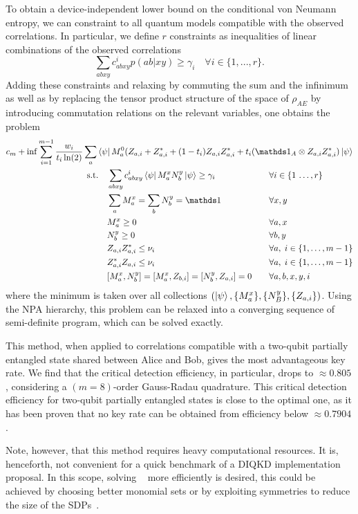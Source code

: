 To obtain a device-independent lower bound on the conditional von Neumann entropy, we can constraint  to all quantum models compatible with the observed correlations. 
In particular, we define $r$ constraints as inequalities of linear combinations of the observed correlations 
\begin{equation}
	\sum_{abxy}c^i_{abxy}p(ab|xy) \geq \gamma_i \quad \forall i\in\{1,...,r\}.
\end{equation}
Adding these constraints and relaxing  by commuting the sum and the infinimum as well as by replacing the tensor product structure of the space of $\rho_{AE}$ by introducing commutation relations on the relevant variables, one obtains the problem 
\begin{equation}
	\begin{aligned}
		c_m + \inf \sum_{i=1}^{m-1}\frac{w_i}{t_i\ln(2)}\sum_a 	\bra{\psi} M_a^0(Z_{a,i}+ Z_{a,i}^* +(1-t_i)Z_{a,i}Z_{a,i}^*+t_i(\id_A\otimes Z_{a,i} Z_{a,i}^*)\ket{\psi} \\
	\begin{alignedat}{3}
			  &\text{s.t.}\quad && \sum_{abxy} c^i_{abxy}\bra{\psi} M_a^x N_b^y \ket{\psi} \geq \gamma_i  &&\forall i\in\{1\,\dots,r\} \\
			  & && \sum_a M_a^x = \sum_b N_b^y = \id &&\forall x,y\\
			  & && M_a^x \geq 0 && \forall a,x\\
			  & && N_b^y \geq 0 && \forall b,y\\
			  & && Z_{a,i}Z_{a,i}^* \leq \nu_i &&\forall a, \; i\in\{1,\dots,m-1\} \\
			  & && Z_{a,i}^*Z_{a,i} \leq \nu_i &&\forall a, \; i\in\{1,\dots,m-1\} \\
			  & && [M_a^x,N_b^y]=[M_a^x,Z_{b,i}]=[N_b^y,Z_{a,i}] = 0 \qquad&&\forall a,b,x,y,i
	\end{alignedat}
	\end{aligned}
	\label{eq:NPA_DIQKD}
\end{equation}
where the minimum is taken over all collections $(\ket{\psi},\{M_a^x\},\{N_B^y\},\{Z_{a,i}\})$.
Using the NPA hierarchy, this problem can be relaxed into a converging sequence of semi-definite program, which can be solved exactly.

\medbreak

This method, when applied to correlations compatible with a two-qubit partially entangled state shared between Alice and Bob, gives the most advantageous key rate. 
We find that the critical detection efficiency, in particular, drops to $\approx 0.805$, considering a $(m=8)$-order Gauss-Radau quadrature.
This critical detection efficiency for two-qubit partially entangled states is close to the optimal one, as it has been proven that no key rate can be obtained from efficiency below $\approx 0.7904$\cite{Lukanowski2022}.

Note, however, that this method requires heavy computational resources.
It is, henceforth, not convenient for a quick benchmark of a DIQKD implementation proposal.
In this scope, solving ~ more efficiently is desired, this could be achieved by choosing better monomial sets or by exploiting symmetries to reduce the size of the SDPs~\cite{Rosset2021}.
